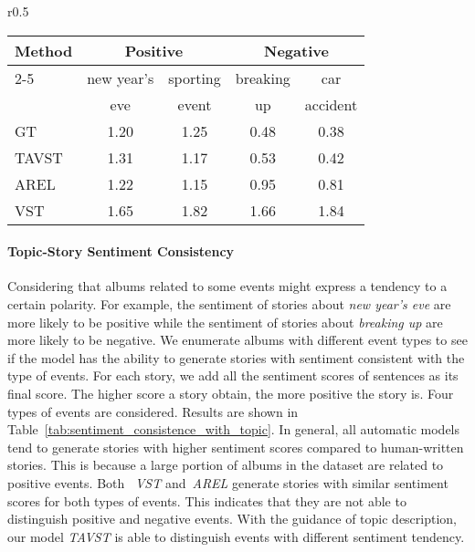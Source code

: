 \documentclass[11pt]{article}
\begin{document}
\begin{wraptable}{r}{0.5\textwidth}

\centering
\small
\begin{tabular}{l|cc|cc}
\hline
\multirow{3}{*}{Method} & \multicolumn{2}{c|}{Positive}                     & \multicolumn{2}{c}{Negative}           \\ \cline{2-5} 
                        & new year's & sporting & breaking & car  \\
                        & eve & event & up & accident \\ 
\hline
GT            & 1.20                      & 1.25                  & 0.48             & 0.38              \\
TAVST                   & 1.31                      & 1.17                  & 0.53             & 0.42              \\
AREL                    & 1.22                      & 1.15                  & 0.95              & 0.81               \\
VST                     & 1.65                      & 1.82                  & 1.66              & 1.84               \\ \hline
\end{tabular}
\smallskip
\vspace{-1mm}

\caption{Sentiment scores corresponding to different types of events. Note that higher score indicates more positive polarity.}
\vspace{-2mm}

\label{tab:sentiment_consistence_with_topic}

\end{wraptable}


\paragraph{Topic-Story Sentiment Consistency}
Considering that albums related to some events might express a tendency to a certain polarity. For example, the sentiment of stories about \emph{new year's eve} are more likely to be positive while the sentiment of stories about \emph{breaking up} are more likely to be negative. We enumerate albums with different event types to see if the model has the ability to generate stories with sentiment consistent with the type of events. For each story, we add all the sentiment scores of sentences as its final score. The higher score a story obtain, the more positive the story is. Four types of events are considered. Results are shown in Table~\ref{tab:sentiment_consistence_with_topic}. In general, all automatic models tend to generate stories with higher sentiment scores compared to human-written stories. This is because a large portion of albums in the dataset are related to positive events.  Both ~\emph{VST} and~\emph{AREL} generate stories with similar sentiment scores for both types of events. This indicates that they are not able to distinguish positive and negative events. With the guidance of topic description, our model \emph{TAVST} is able to distinguish events with different sentiment tendency. 
\end{document}
